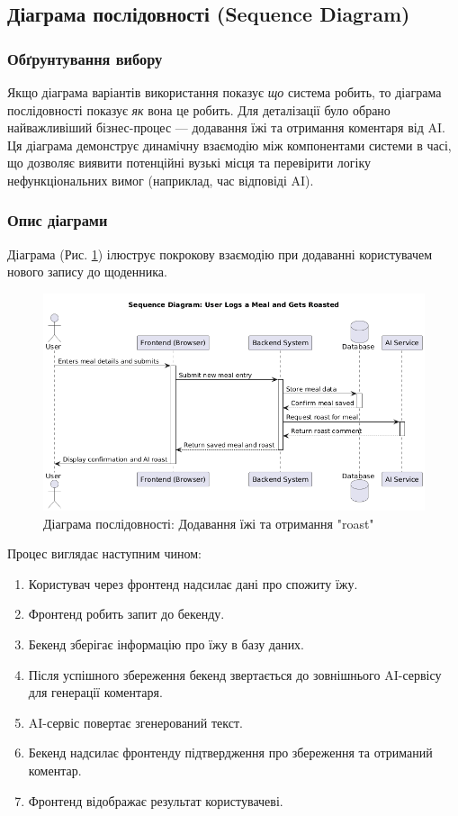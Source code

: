 \documentclass[12pt, a4paper]{article}
\begin{document}
\subsection{Діаграма послідовності (Sequence Diagram)}

\subsubsection{Обґрунтування вибору}
Якщо діаграма варіантів використання показує \textit{що} система робить, то
діаграма послідовності показує \textit{як} вона це робить. Для деталізації було
обрано найважливіший бізнес-процес — додавання їжі та отримання коментаря від
AI. Ця діаграма демонструє динамічну взаємодію між компонентами системи в часі,
що дозволяє виявити потенційні вузькі місця та перевірити логіку
нефункціональних вимог (наприклад, час відповіді AI).

\subsubsection{Опис діаграми}
Діаграма (Рис. \ref{fig:sequence_roast}) ілюструє покрокову взаємодію при
додаванні користувачем нового запису до щоденника.

\begin{figure}[h!]
    \centering
    \includegraphics[width=\textwidth]{sequence_roast.png}
    \caption{Діаграма послідовності: Додавання їжі та отримання "roast"}
    \label{fig:sequence_roast}
\end{figure}

Процес виглядає наступним чином:
\begin{enumerate}
    \item Користувач через фронтенд надсилає дані про спожиту їжу.
    \item Фронтенд робить запит до бекенду.
    \item Бекенд зберігає інформацію про їжу в базу даних.
    \item Після успішного збереження бекенд звертається до зовнішнього
        AI-сервісу для генерації коментаря.
    \item AI-сервіс повертає згенерований текст.
    \item Бекенд надсилає фронтенду підтвердження про збереження та отриманий
        коментар.
    \item Фронтенд відображає результат користувачеві.
\end{enumerate}
\end{document}
